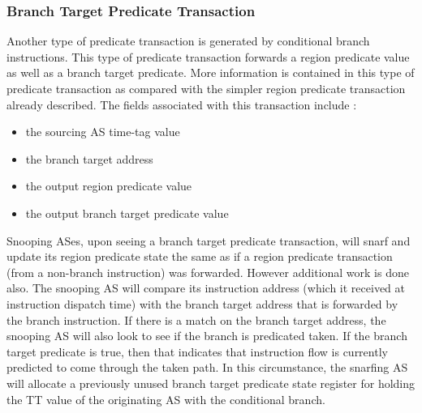\documentclass[10pt,dvips]{article}
\begin{document}
\subsubsection{Branch Target Predicate Transaction}
%
Another type of predicate transaction is generated by conditional branch
instructions.
This type of predicate transaction forwards a 
region predicate value as well as
a branch target predicate.
More information is contained in this type of predicate transaction
as compared with the simpler region predicate transaction already
described.
The fields associated with this transaction include :
%
\begin{itemize}
\item{the sourcing AS time-tag value}
\item{the branch target address}
\item{the output region predicate value}
\item{the output branch target predicate value}
\end{itemize}   
%
Snooping ASes, upon seeing a branch target predicate transaction, 
will snarf and
update its region predicate state the same as if a region predicate 
transaction
(from a
non-branch instruction) was forwarded.
However additional work is
done also.  The snooping AS will compare its instruction address (which
it received at instruction dispatch time)
with the branch target address that is forwarded by the
branch instruction.  If there is a match on the branch target address,
the snooping AS will also look to see if the branch is predicated taken.
If the branch target predicate is true, then that indicates that
instruction flow is currently predicted to come through the taken
path.  
In this circumstance, the snarfing AS will allocate
a previously unused branch target predicate state register for holding
the TT value of the originating AS with the conditional branch.
%
\end{document}
